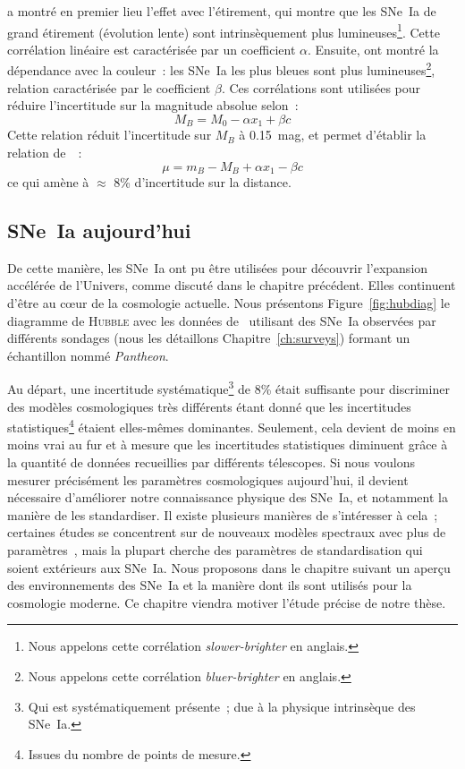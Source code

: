\documentclass[../main/main.tex]{subfiles}
\begin{document}
\cite{phillips1993} a montré en premier lieu l'effet avec l'étirement, qui
montre que les SNe~Ia de grand étirement (évolution lente) sont intrinsèquement
plus lumineuses\footnote{Nous appelons cette corrélation
\textit{slower-brighter} en anglais.}. Cette corrélation linéaire est
caractérisée par un coefficient $\alpha$. Ensuite, \cite{hamuy1996} ont montré
la dépendance avec la couleur~: les SNe~Ia les plus bleues sont plus
lumineuses\footnote{Nous appelons cette corrélation \textit{bluer-brighter} en
anglais.}, relation caractérisée par le coefficient $\beta$. Ces corrélations
sont utilisées pour réduire l'incertitude sur la magnitude absolue selon~:
\begin{equation}\label{eq:mxc}
    M_B = M_0 - \alpha x_1 + \beta c
\end{equation}
Cette relation réduit l'incertitude sur $M_B$ à \SI{0.15}{mag}, et permet
d'établir la relation de~\cite{tripp1998}~:
\begin{equation}
    \mu = m_B - M_B + \alpha x_1 - \beta c
\end{equation}
ce qui amène à $\approx$ 8\% d'incertitude sur la distance.

\subsection{SNe~Ia aujourd'hui}\label{ssec:snetoday}

De cette manière, les SNe~Ia ont pu être utilisées pour découvrir l'expansion
accélérée de l'Univers, comme discuté dans le chapitre précédent. Elles
continuent d'être au cœur de la cosmologie actuelle. Nous présentons
Figure~\ref{fig:hubdiag} le diagramme de \textsc{Hubble} avec les données
de~\cite{scolnic2018} utilisant des SNe~Ia observées par différents sondages
(nous les détaillons Chapitre~\ref{ch:surveys}) formant un échantillon nommé
\textit{Pantheon}.

Au départ, une incertitude systématique\footnote{Qui est systématiquement
présente~; due à la physique intrinsèque des SNe~Ia.} de 8\% était suffisante
pour discriminer des modèles cosmologiques très différents étant donné que les
incertitudes statistiques\footnote{Issues du nombre de points de mesure.}
étaient elles-mêmes dominantes. Seulement, cela devient de moins en moins vrai
au fur et à mesure que les incertitudes statistiques diminuent grâce à la
quantité de données recueillies par différents télescopes. Si nous voulons
mesurer précisément les paramètres cosmologiques aujourd'hui, il devient
nécessaire d'améliorer notre connaissance physique des SNe~Ia, et notamment la
manière de les standardiser. Il existe plusieurs manières de s'intéresser à
cela~; certaines études se concentrent sur de nouveaux modèles spectraux avec
plus de paramètres~\cite[par exemple][]{leget2020}, mais la plupart cherche des
paramètres de standardisation qui soient extérieurs aux SNe~Ia. Nous proposons
dans le chapitre suivant un aperçu des environnements des SNe~Ia et la manière
dont ils sont utilisés pour la cosmologie moderne. Ce chapitre viendra motiver
l'étude précise de notre thèse.
\end{document}
